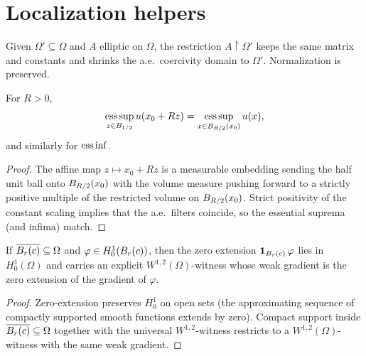 \section{Localization helpers}

\begin{definition}
\label{def:EllipticCoeff_restrict}
\leanok
{}
Given $\Omega' \subseteq \Omega$ and $A$ elliptic on $\Omega$, the restriction $A\!\restriction\!\Omega'$ keeps the same matrix and constants and shrinks the a.e.\ coercivity domain to $\Omega'$. Normalization is preserved.
\end{definition}

\begin{lemma}
\label{lem:essSup_rescale_halfBall}
\leanok
For $R > 0$,
\begin{equation*}
  \operatorname*{ess\,sup}_{z \in B_{1/2}} u(x_0 + R z) = \operatorname*{ess\,sup}_{x \in B_{R/2}(x_0)} u(x),
\end{equation*}
and similarly for $\operatorname*{ess\,inf}$.
\end{lemma}

\begin{proof}
\leanok

The affine map $z \mapsto x_0 + R z$ is a measurable embedding sending the half unit ball onto $B_{R/2}(x_0)$ with the volume measure pushing forward to a strictly positive multiple of the restricted volume on $B_{R/2}(x_0)$. Strict positivity of the constant scaling implies that the a.e.\ filters coincide, so the essential suprema (and infima) match.
\end{proof}

\begin{lemma}
\label{lem:memH01_indicator_ball_of_closedBall_subset}
\leanok
{}
If $\overline{B_{r}(c)} \subseteq \Omega$ and $\varphi \in H^{1}_{0}(B_{r}(c))$, then the zero extension $\mathbf{1}_{B_{r}(c)}\,\varphi$ lies in $H^{1}_{0}(\Omega)$ and carries an explicit $W^{1,2}(\Omega)$-witness whose weak gradient is the zero extension of the gradient of $\varphi$.
\end{lemma}

\begin{proof}
\leanok
{}

Zero-extension preserves $H^{1}_{0}$ on open sets (the approximating sequence of compactly supported smooth functions extends by zero). Compact support inside $\overline{B_{r}(c)} \subseteq \Omega$ together with the universal $W^{1,2}$-witness restricts to a $W^{1,2}(\Omega)$-witness with the same weak gradient.
\end{proof}

